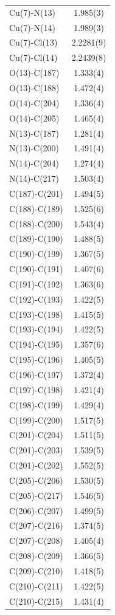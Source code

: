 \begin{center}
{\begin{supertabular}{p{1.5in}c}
Cu(7)-N(13) &1.985(3)\\
Cu(7)-N(14) &1.989(3)\\
Cu(7)-Cl(13) &2.2281(9)\\
Cu(7)-Cl(14) &2.2439(8)\\
O(13)-C(187) &1.333(4)\\
O(13)-C(188) &1.472(4)\\
O(14)-C(204) &1.336(4)\\
O(14)-C(205) &1.465(4)\\
N(13)-C(187) &1.281(4)\\
N(13)-C(200) &1.491(4)\\
N(14)-C(204) &1.274(4)\\
N(14)-C(217) &1.503(4)\\
C(187)-C(201) &1.494(5)\\
C(188)-C(189) &1.525(6)\\
C(188)-C(200) &1.543(4)\\
C(189)-C(190) &1.488(5)\\
C(190)-C(199) &1.367(5)\\
C(190)-C(191) &1.407(6)\\
C(191)-C(192) &1.363(6)\\
C(192)-C(193) &1.422(5)\\
C(193)-C(198) &1.415(5)\\
C(193)-C(194) &1.422(5)\\
C(194)-C(195) &1.357(6)\\
C(195)-C(196) &1.405(5)\\
C(196)-C(197) &1.372(4)\\
C(197)-C(198) &1.421(4)\\
C(198)-C(199) &1.429(4)\\
C(199)-C(200) &1.517(5)\\
C(201)-C(204) &1.511(5)\\
C(201)-C(203) &1.539(5)\\
C(201)-C(202) &1.552(5)\\
C(205)-C(206) &1.530(5)\\
C(205)-C(217) &1.546(5)\\
C(206)-C(207) &1.499(5)\\
C(207)-C(216) &1.374(5)\\
C(207)-C(208) &1.405(4)\\
C(208)-C(209) &1.366(5)\\
C(209)-C(210) &1.418(5)\\
C(210)-C(211) &1.422(5)\\
C(210)-C(215) &1.431(4)\\

\end{supertabular}}
\end{center}
